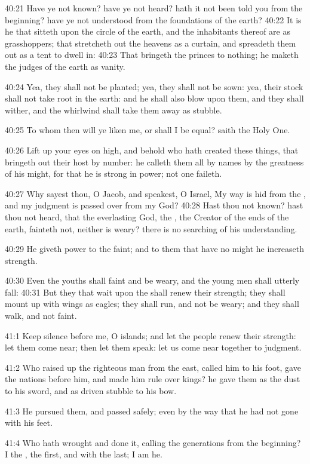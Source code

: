 40:21 Have ye not known? have ye not heard? hath it not been told you
from the beginning? have ye not understood from the foundations of the
earth?  40:22 It is he that sitteth upon the circle of the earth, and
the inhabitants thereof are as grasshoppers; that stretcheth out the
heavens as a curtain, and spreadeth them out as a tent to dwell in:
40:23 That bringeth the princes to nothing; he maketh the judges of
the earth as vanity.

40:24 Yea, they shall not be planted; yea, they shall not be sown:
yea, their stock shall not take root in the earth: and he shall also
blow upon them, and they shall wither, and the whirlwind shall take
them away as stubble.

40:25 To whom then will ye liken me, or shall I be equal? saith the
Holy One.

40:26 Lift up your eyes on high, and behold who hath created these
things, that bringeth out their host by number: he calleth them all by
names by the greatness of his might, for that he is strong in power;
not one faileth.

40:27 Why sayest thou, O Jacob, and speakest, O Israel, My way is hid
from the \LORD, and my judgment is passed over from my God?  40:28 Hast
thou not known? hast thou not heard, that the everlasting God, the
\LORD, the Creator of the ends of the earth, fainteth not, neither is
weary? there is no searching of his understanding.

40:29 He giveth power to the faint; and to them that have no might he
increaseth strength.

40:30 Even the youths shall faint and be weary, and the young men
shall utterly fall: 40:31 But they that wait upon the \LORD shall renew
their strength; they shall mount up with wings as eagles; they shall
run, and not be weary; and they shall walk, and not faint.

41:1 Keep silence before me, O islands; and let the people renew their
strength: let them come near; then let them speak: let us come near
together to judgment.

41:2 Who raised up the righteous man from the east, called him to his
foot, gave the nations before him, and made him rule over kings? he
gave them as the dust to his sword, and as driven stubble to his bow.

41:3 He pursued them, and passed safely; even by the way that he had
not gone with his feet.

41:4 Who hath wrought and done it, calling the generations from the
beginning? I the \LORD, the first, and with the last; I am he.

